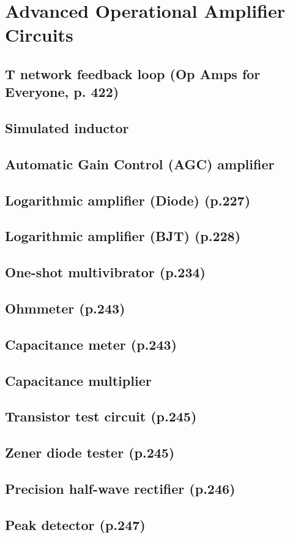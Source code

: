 \chapter{Advanced Operational Amplifier Circuits}

\section{T network feedback loop (Op Amps for Everyone, p. 422)}

\section{Simulated inductor}

\section{Automatic Gain Control (AGC) amplifier}

\section{Logarithmic amplifier (Diode) (p.227)}

\section{Logarithmic amplifier (BJT) (p.228)}

\section{One-shot multivibrator (p.234)}

\section{Ohmmeter (p.243)}

\section{Capacitance meter (p.243)}

\section{Capacitance multiplier}

\section{Transistor test circuit (p.245)}

\section{Zener diode tester (p.245)}

\section{Precision half-wave rectifier (p.246)}

\section{Peak detector (p.247)}